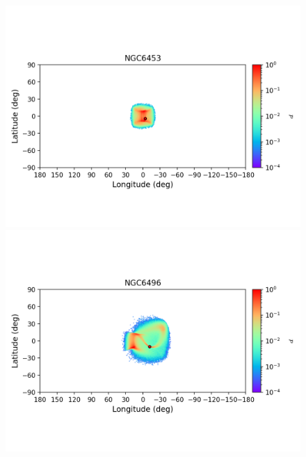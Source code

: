         \begin{figure}
            \begin{center}
                \includegraphics[clip=true, trim = 0mm 20mm 0mm 10mm, width=1\columnwidth]{images/error_plots_NGC6453.png}
                \includegraphics[clip=true, trim = 0mm 20mm 0mm 10mm, width=1\columnwidth]{images/error_plots_NGC6496.png}
                

\end{center}
\end{figure}
